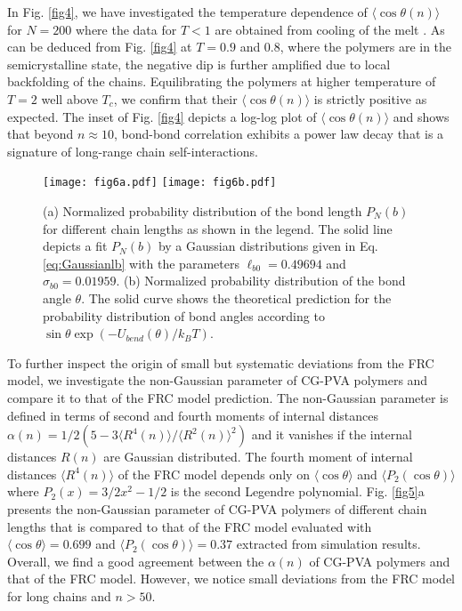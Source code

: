 \documentclass[pre,showpacs,notitlepage,twocolumn]{revtex4-1}
\begin{document}
  In  Fig. \ref{fig4}, we have investigated the temperature dependence of $\langle \cos \theta  (n) \rangle$  for $N=200$ where the data for $T<1$ are obtained from cooling of the melt \cite{Meyer2002,SaraLMC}. As can be deduced from  Fig. \ref{fig4} at $T=0.9$ and 0.8, where the polymers are in the semicrystalline state, the negative dip is further amplified  due to local backfolding of the chains. Equilibrating the polymers  at higher temperature of $T=2$ well above $T_c$,   we confirm that their $\langle  \cos \theta (n)\rangle$ is strictly positive as expected. The  inset of  Fig. \ref{fig4} depicts a log-log plot of $\langle  \cos \theta (n)\rangle$ and shows that  beyond $n \approx 10$, bond-bond correlation exhibits a power law decay that is a signature of long-range chain self-interactions. 
 
 
 
 
 
 
\begin{figure*}[t]
\texttt{[image: fig6a.pdf]}
\texttt{[image: fig6b.pdf]}
\caption{(a) Normalized probability distribution of the bond length $P_N (b)$ for different chain lengths as shown in the legend. The solid line depicts a fit 
$P_N (b)$ by a Gaussian distributions given in Eq. \eqref{eq:Gaussianlb} with the
 parameters $\ell_{b0}=0.49694$ and   $\sigma_{b0} = 0.01959$. (b) Normalized probability distribution of the bond angle $\theta$. The solid curve  shows the theoretical  prediction for
 the probability 
distribution of bond angles according to  $ \sin \theta \exp(-U_{bend}(\theta)/k_BT)$. }
\label{fig6} 
\end{figure*}
%
   
  To further inspect the origin of  small but systematic deviations from the FRC model, we investigate the non-Gaussian parameter of CG-PVA polymers and compare it to that of the FRC model prediction.
The non-Gaussian parameter is defined in terms of second and fourth moments of internal distances  $\alpha(n)=1/2(5-3\langle R^4(n) \rangle /  \langle R^2(n) \rangle ^2 ) $ and it  
  vanishes if the internal distances $R(n)$ are Gaussian distributed.  
    The fourth moment of internal distances $\langle  R^4 (n)\rangle$ of the FRC model depends only on  $\langle \cos \theta \rangle$ and $ \langle P_2( \cos \theta) \rangle$ 
    \cite{Honnell} where $P_2(x)=3/2 x^2-1/2$ is the second Legendre polynomial. Fig. \ref{fig5}a presents the non-Gaussian parameter of CG-PVA polymers of different chain lengths
   that is compared to that of the FRC model evaluated with $ \langle \cos \theta \rangle=0.699$ and $ \langle P_2( \cos \theta) \rangle=0.37$ extracted from simulation results. Overall, we find a good agreement between 
   the $\alpha(n)$ of CG-PVA polymers    and that of the FRC model. However, we notice small deviations from the FRC model for long chains and $n>50$.
   
\end{document}
